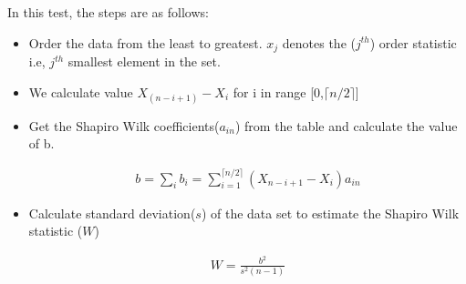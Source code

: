 \documentclass[10pt]{beamer}
\begin{document}
\begin{frame}{}
 In this test, the steps are as follows:
       \begin{itemize}
           \item Order the data from the least to greatest. $x_{j}$ denotes the ($j^{th}$) order statistic i.e, $j^{th}$ smallest element in the set.
           \item We calculate value $X_{(n-i+1)}-X_{i}$ for i in range [0,$\lceil{n/2}\rceil$]
           \item Get the Shapiro Wilk coefficients($a_{in}$) from the table and calculate the value of b.
            \begin{block}{}
            \begin{align}
              b=\sum_{i} b_{i} = \sum_{i=1}^{\lceil{n/2}\rceil} (X_{n-i+1}-X_{i}) a_{in} 
            \end{align}
            \end{block}
            \item Calculate standard deviation($s$) of the data set to estimate the Shapiro Wilk statistic ($W$)
            \begin{block}{}
            \begin{align}
                W = \frac{b^{2}}{s^{2}(n-1)}
            \end{align}
            \end{block}
       \end{itemize}
\end{frame}
\end{document}
